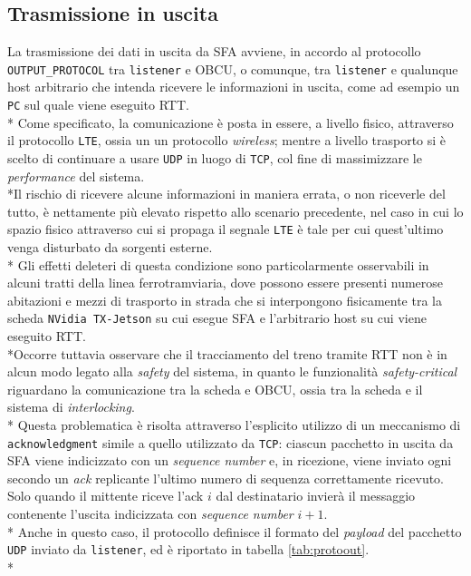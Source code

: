 \subsection{Trasmissione in uscita}
La trasmissione dei dati in uscita da SFA avviene, in accordo al protocollo \texttt{OUTPUT\_PROTOCOL} tra \texttt{listener} e OBCU, o comunque, tra \texttt{listener} e qualunque host arbitrario che intenda ricevere le informazioni in uscita, come ad esempio un \texttt{PC} sul quale viene eseguito RTT.\\*
Come specificato, la comunicazione \`e posta in essere, a livello fisico, attraverso il protocollo \texttt{LTE}, ossia un un protocollo \emph{wireless}; mentre a livello trasporto si \`e scelto di continuare a usare \texttt{UDP} in luogo di \texttt{TCP}, col fine di massimizzare le \emph{performance} del sistema.\\*Il rischio di ricevere alcune informazioni in maniera errata, o non riceverle del tutto, \`e nettamente pi\`u elevato rispetto allo scenario precedente, nel caso in cui lo spazio fisico attraverso cui si propaga il segnale \texttt{LTE} \`e tale per cui quest'ultimo venga disturbato da sorgenti esterne.\\* Gli effetti deleteri di questa condizione sono particolarmente osservabili in alcuni tratti della linea ferrotramviaria, dove possono essere presenti numerose abitazioni e mezzi di trasporto in strada che si interpongono fisicamente tra la scheda \texttt{NVidia TX-Jetson} su cui esegue SFA e l'arbitrario host su cui viene eseguito RTT.\\*Occorre tuttavia osservare che il tracciamento del treno tramite RTT non \`e in alcun modo legato alla \emph{safety} del sistema, in quanto le funzionalit\`a \emph{safety-critical} riguardano la comunicazione tra la scheda e OBCU, ossia tra la scheda e il sistema di \emph{interlocking}.\\*
Questa problematica \`e risolta attraverso l'esplicito utilizzo di un meccanismo di \texttt{acknowledgment} simile a quello utilizzato da \texttt{TCP}: ciascun pacchetto in uscita da SFA viene indicizzato con un \emph{sequence number} e, in ricezione, viene inviato ogni secondo un \emph{ack} replicante l'ultimo numero di sequenza correttamente ricevuto. Solo quando il mittente riceve l'ack $i$ dal destinatario invier\`a il messaggio contenente l'uscita indicizzata con \emph{sequence number} $i+1$.\\*
Anche in questo caso, il protocollo definisce il formato del \emph{payload} del pacchetto \texttt{UDP} inviato da \texttt{listener}, ed \`e riportato in tabella \ref{tab:protoout}.\\*
